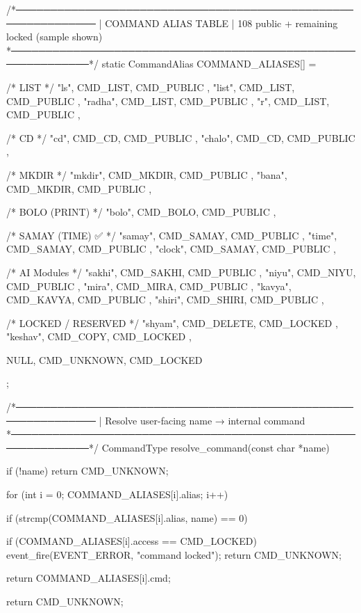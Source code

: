 \documentclass{article}
\begin{document}
/*──────────────────────────────────────────────────────────────
 | COMMAND ALIAS TABLE
 | 108 public + remaining locked (sample shown)
 *──────────────────────────────────────────────────────────────*/
static CommandAlias COMMAND_ALIASES[] = {

    /* LIST */
    { "ls",        CMD_LIST,   CMD_PUBLIC },
    { "list",      CMD_LIST,   CMD_PUBLIC },
    { "radha",     CMD_LIST,   CMD_PUBLIC },
    { "r",         CMD_LIST,   CMD_PUBLIC },

    /* CD */
    { "cd",        CMD_CD,     CMD_PUBLIC },
    { "chalo",     CMD_CD,     CMD_PUBLIC },

    /* MKDIR */
    { "mkdir",     CMD_MKDIR,  CMD_PUBLIC },
    { "bana",      CMD_MKDIR,  CMD_PUBLIC },

    /* BOLO (PRINT) */
    { "bolo",      CMD_BOLO,   CMD_PUBLIC },

    /* SAMAY (TIME) ✅ */
    { "samay",     CMD_SAMAY,  CMD_PUBLIC },
    { "time",      CMD_SAMAY,  CMD_PUBLIC },
    { "clock",     CMD_SAMAY,  CMD_PUBLIC },

/* AI Modules */
    { "sakhi",     CMD_SAKHI,  CMD_PUBLIC },
    { "niyu",      CMD_NIYU,   CMD_PUBLIC },
    { "mira",      CMD_MIRA,   CMD_PUBLIC },
    { "kavya",     CMD_KAVYA,  CMD_PUBLIC },
    { "shiri",     CMD_SHIRI,  CMD_PUBLIC },

    /* LOCKED / RESERVED */
    { "shyam",     CMD_DELETE, CMD_LOCKED },
    { "keshav",    CMD_COPY,   CMD_LOCKED },

    { NULL, CMD_UNKNOWN, CMD_LOCKED }
};

/*──────────────────────────────────────────────────────────────
 | Resolve user-facing name → internal command
 *──────────────────────────────────────────────────────────────*/
CommandType resolve_command(const char *name)
{
    if (!name)
        return CMD_UNKNOWN;

    for (int i = 0; COMMAND_ALIASES[i].alias; i++) {

        if (strcmp(COMMAND_ALIASES[i].alias, name) == 0) {

            if (COMMAND_ALIASES[i].access == CMD_LOCKED) {
                event_fire(EVENT_ERROR, "command locked");
                return CMD_UNKNOWN;
            }

            return COMMAND_ALIASES[i].cmd;
        }
    }

    return CMD_UNKNOWN;
}
\end{document}
